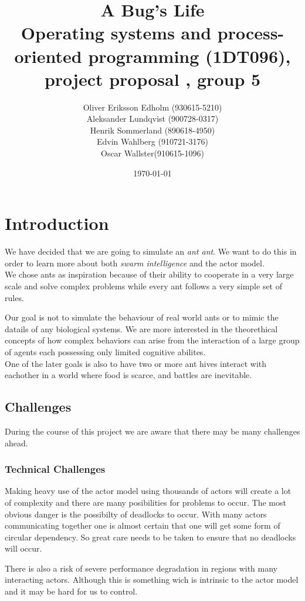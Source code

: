 \documentclass[a4paper]{article}
\title{A Bug's Life\\
 Operating systems and process-oriented programming (1DT096), project proposal
, group 5}
\date{\today}
\author{Oliver Eriksson Edholm (930615-5210) \\
Aleksander Lundqvist (900728-0317) \\
Henrik Sommerland (890618-4950) \\
Edvin Wahlberg (910721-3176) \\
Oscar Wallster(910615-1096)}
\begin{document}
\maketitle

\section{Introduction}
We have decided that we are going to simulate an \emph{ant ant}. We want to do
this in order to learn more about both \emph{swarm intelligence} and the actor
model.\\
We chose ants as inspiration because of their ability to cooperate in a very large
scale and solve complex problems while every ant follows a very simple set of rules.

Our goal is not to simulate the behaviour of real world ants or to mimic the
datails of any biological systems.
We are more interested in the theorethical concepts of how complex behaviors can
arise from the interaction of a large group of agents each possessing only limited
cognitive abilites.\\

One of the later goals is also to have two or more ant hives interact with
eachother in a world where food is scarce, and battles are inevitable.

\subsection{Challenges}
During the course of this project we are aware that there may be many challenges
ahead.

\subsubsection{Technical Challenges}
Making heavy use of the actor model using thousands of actors will create a lot
of complexity and there are many posibilities for problems to occur. The most
obvious danger is the possibilty of deadlocks to occur. With many actors
communicating together one is almost certain that one will get some form of
circular dependency. So great care needs to be taken to ensure that no
deadlocks will occur.

There is also a risk of severe performance degradation in regions with many
interacting actors. Although this is something wich is intrinsic to the actor
model and it may be hard for us to control.
\end{document}
